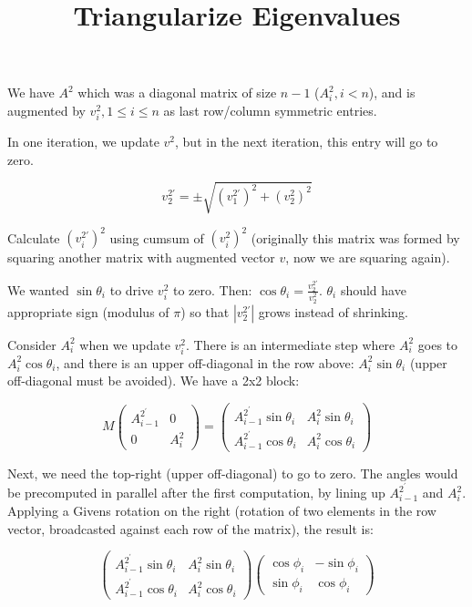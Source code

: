 \documentclass{article}
\title{Triangularize Eigenvalues}
\begin{document}
	
\maketitle

We have $A^2$ which was a diagonal matrix of size $n-1$ ($A^2_i, i < n$), and is augmented by $v^2_i, 1 \le i \le n$ as last row/column symmetric entries.

In one iteration, we update $v^2$, but in the next iteration, this entry will go to zero.

$$v^{2\prime}_2 = \pm \sqrt{\left(v^{2\prime}_1\right)^2 + \left(v^2_2\right)^2}$$

Calculate $\left(v_i^{2\prime}\right)^2$ using cumsum of $\left(v_i^2\right)^2$ (originally this matrix was formed by squaring another matrix with augmented vector $v$, now we are squaring again).

We wanted $\sin \theta_i$ to drive $v_i^2$ to zero. Then: $\cos \theta_i = \frac{v_2^{2\prime}}{v_2^2}$. $\theta_i$ should have appropriate sign (modulus of $\pi$) so that $\left|v_2^{2\prime}\right|$ grows instead of shrinking.

Consider $A^2_i$ when we update $v^2_i$. There is an intermediate step where $A^2_i$ goes to $A^2_i \cos\theta_i$, and there is an upper off-diagonal in the row above: $A^2_i \sin\theta_i$ (upper off-diagonal must be avoided). We have a 2x2 block:

$$
M
\left(\begin{matrix}
	A^{2^\prime}_{i-1} & 0
	\\
	0 & A^{2}_{i}
\end{matrix}\right)
=
\left(\begin{matrix} A^{2^\prime}_{i-1} \sin\theta_i & A^2_i \sin\theta_i \\ A^{2^\prime}_{i-1} \cos\theta_i & A^2_i \cos\theta_i \end{matrix}\right)$$

Next, we need the top-right (upper off-diagonal) to go to zero. The angles would be precomputed in parallel after the first computation, by lining up $A_{i-1}^{2^\prime}$ and $A_i^2$. Applying a Givens rotation on the right (rotation of two elements in the row vector, broadcasted against each row of the matrix), the result is:

$$\left(\begin{matrix}
	A^{2^\prime}_{i-1} \sin\theta_i & A^2_i \sin\theta_i \\ A^{2^\prime}_{i-1} \cos\theta_i & A^2_i \cos\theta_i
\end{matrix}\right)
\left(\begin{matrix}
	\cos\phi_i & -\sin\phi_i \\
	\sin\phi_i & \cos\phi_i
\end{matrix}\right)
$$
\end{document}

